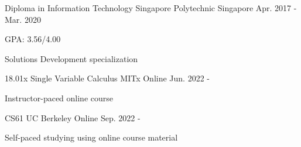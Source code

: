 

\begin{cventries}

  \cventry
    {Diploma in Information Technology} %
    {Singapore Polytechnic} %
    {Singapore} %
    {Apr. 2017 - Mar. 2020} %
    {
      \begin{cvitems} %
        \item {GPA: 3.56/4.00}
        \item {Solutions Development specialization}
      \end{cvitems}
    }

    \cventry
    {18.01x Single Variable Calculus} %
    {MITx} %
    {Online} %
    {Jun. 2022 - } %
    {
      \begin{cvitems} %
        \item {Instructor-paced online course}
      \end{cvitems}
    }

    \cventry
    {CS61} %
    {UC Berkeley} %
    {Online} %
    {Sep. 2022 - } %
    {
      \begin{cvitems} %
        \item {Self-paced studying using online course material}
      \end{cvitems}
    }


\end{cventries}
